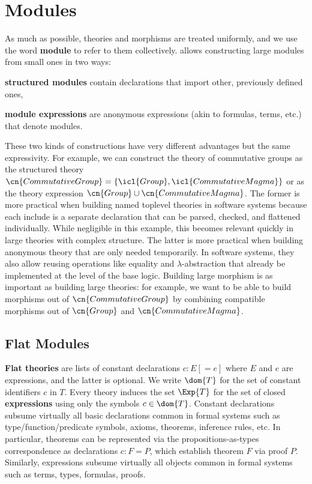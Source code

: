 \section{\mmt Modules}

As much as possible, theories and morphisms are treated uniformly, and we use the word \textbf{module} to refer to them collectively.
\mmt allows constructing large modules from small ones in two ways:
\begin{compactitem}
  \item \textbf{structured modules} contain declarations that import other, previously defined ones,
  \item \textbf{module expressions} are anonymous expressions (akin to formulas, terms, etc.) that denote modules.
\end{compactitem}

These two kinds of constructions have very different advantages but the same expressivity.
For example, we can construct the theory of commutative groups as the structured theory $\cn{CommutativeGroup}=\{\icl{Group},\icl{CommutativeMagma}\}$ or as the theory expression $\cn{Group}\cup\cn{CommutativeMagma}$.
The former is more practical when building named toplevel theories in software systems because each include is a separate declaration that can be parsed, checked, and flattened individually.
While negligible in this example, this becomes relevant quickly in large theories with complex structure.
The latter is more practical when building anonymous theory that are only needed temporarily.
In software systems, they also allow reusing operations like equality and $\lambda$-abstraction that already be implemented at the level of the base logic.
Building large morphism is as important as building large theories: for example, we want to be able to build morphisms out of $\cn{CommutativeGroup}$ by combining compatible morphisms out of $\cn{Group}$ and $\cn{CommutativeMagma}$.

\subsection{Flat Modules}
\textbf{Flat theories} are lists of constant declarations $c:E[=e]$ where $E$ and $e$ are expressions, and the latter is optional.
We write $\dom{T}$ for the set of constant identifiers $c$ in $T$.
Every theory induces the set $\Exp{T}$ for the set of closed \textbf{expressions} using only the symbols $c\in\dom{T}$.
Constant declarations subsume virtually all basic declarations common in formal systems such as type/function/predicate symbols, axioms, theorems, inference rules, etc.
In particular, theorems can be represented via the propositions-as-types correspondence as declarations $c:F=P$, which establish theorem $F$ via proof $P$.
Similarly, \mmt expressions subsume virtually all objects common in formal systems such as terms, types, formulas, proofs.

